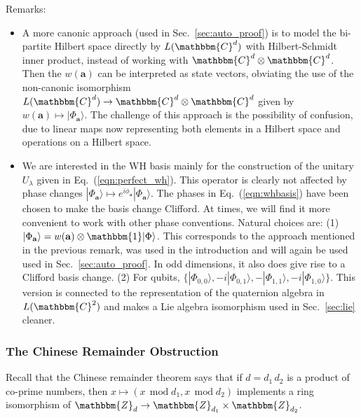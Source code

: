 \documentclass[aps,nofootinbib,floatfix,a4paper]{revtex4}
\newcommand{\1}{\mbox{$\mathbf{1}$}}
\def\ZZ{\mathbbm{Z}}
\def\CC{\mathbbm{C}}
\def\Id{\mathbbm{1}}
\renewcommand{\vec}{\mathbf}
\begin{document}
Remarks:
\begin{itemize}
	\item
		A more canonic approach 
		(used in Sec.~\ref{sec:auto_proof})
		is to model the bi-partite Hilbert space directly by $L(\CC^d)$ with Hilbert-Schmidt inner product, instead of working with $\CC^d\otimes\CC^d$.
		Then 
		the $w(\vec a)$ 
		can be interpreted as state vectors, obviating the use of the non-canonic isomorphism $L(\CC^d)\to \CC^d\otimes \CC^d$ given by $w(\vec a) \mapsto |\Phi_{\vec a}\rangle$.
		The challenge of this approach is the possibility of confusion, due to linear maps now representing both elements in a Hilbert space and operations on a Hilbert space.

	\item
		We are interested in the WH basis mainly for the construction of the unitary $U_\lambda$ given in Eq.~(\ref{eqn:perfect_wh}).
		This operator is clearly not affected by phase changes $|\Phi_{\vec a}\rangle \mapsto e^{i\phi_\vec a} |\Phi_{\vec a}\rangle$.
		The phases in Eq.~(\ref{eqn:whbasis}) have been chosen to make the basis change Clifford.
		At times, we will find it more convenient to work with other phase conventions.
		Natural choices are:
		(1) $|\Phi_{\vec a}\rangle = w(\vec a)\otimes \Id|\Phi\rangle$.
		This corresponds to the approach mentioned in the previous remark, was used in the introduction and will again be used used in Sec.~\ref{sec:auto_proof}. 
		In odd dimensions, it also does give rise to a Clifford basis change.
		(2) For qubits, $\{ |\Phi_{0,0}\rangle, -i |\Phi_{0,1}\rangle, - |\Phi_{1,1}\rangle, -i |\Phi_{1,0}\rangle \}$.
		This version is connected to the representation of the quaternion algebra in $L(\CC^2)$ and makes a Lie algebra isomorphism used in Sec.~\ref{sec:lie} cleaner.
\end{itemize}

\subsubsection{The Chinese Remainder Obstruction}
\label{sec:great_wall}

Recall that the Chinese remainder theorem says that if $d=d_1 \, d_2$ is a product of co-prime numbers, then $x\mapsto (x\, \operatorname{mod} d_1, x \, \operatorname{mod} d_2)$ implements a ring isomorphism of $\ZZ_d\to\ZZ_{d_1}\times \ZZ_{d_2}$.
\end{document}
